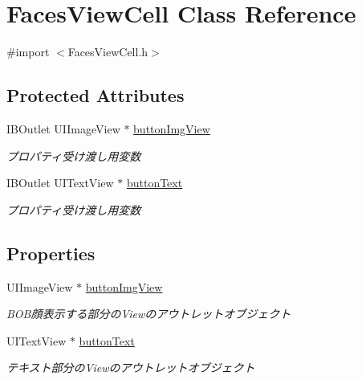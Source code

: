 \hypertarget{interface_faces_view_cell}{
\section{FacesViewCell Class Reference}
\label{interface_faces_view_cell}
}


{\ttfamily \#import $<$FacesViewCell.h$>$}

\subsection*{Protected Attributes}
\begin{DoxyCompactItemize}
\item 
\hypertarget{interface_faces_view_cell_a68d26c240de5882b823f220773e97afd}{
IBOutlet UIImageView $\ast$ \hyperlink{interface_faces_view_cell_a68d26c240de5882b823f220773e97afd}{buttonImgView}}
\label{interface_faces_view_cell_a68d26c240de5882b823f220773e97afd}

\begin{DoxyCompactList}\small\item\em プロパティ受け渡し用変数 \end{DoxyCompactList}\item 
\hypertarget{interface_faces_view_cell_a7d408a245bbc7b1df32c5d8fd3cd153d}{
IBOutlet UITextView $\ast$ \hyperlink{interface_faces_view_cell_a7d408a245bbc7b1df32c5d8fd3cd153d}{buttonText}}
\label{interface_faces_view_cell_a7d408a245bbc7b1df32c5d8fd3cd153d}

\begin{DoxyCompactList}\small\item\em プロパティ受け渡し用変数 \end{DoxyCompactList}\end{DoxyCompactItemize}
\subsection*{Properties}
\begin{DoxyCompactItemize}
\item 
\hypertarget{interface_faces_view_cell_a7afecd05db3ddec493a8a8d3bc809a50}{
UIImageView $\ast$ \hyperlink{interface_faces_view_cell_a7afecd05db3ddec493a8a8d3bc809a50}{buttonImgView}}
\label{interface_faces_view_cell_a7afecd05db3ddec493a8a8d3bc809a50}

\begin{DoxyCompactList}\small\item\em BOB顔表示する部分のViewのアウトレットオブジェクト \end{DoxyCompactList}\item 
\hypertarget{interface_faces_view_cell_a8aeb43598062954f04c5bde235a3de0e}{
UITextView $\ast$ \hyperlink{interface_faces_view_cell_a8aeb43598062954f04c5bde235a3de0e}{buttonText}}
\label{interface_faces_view_cell_a8aeb43598062954f04c5bde235a3de0e}

\begin{DoxyCompactList}\small\item\em テキスト部分のViewのアウトレットオブジェクト \end{DoxyCompactList}\end{DoxyCompactItemize}


